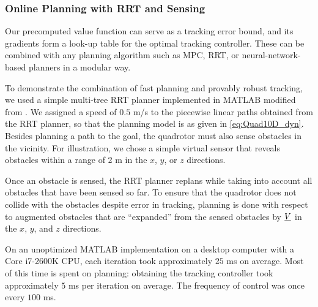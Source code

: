 \subsubsection{Online Planning with RRT and Sensing}
Our precomputed value function can serve as a tracking error bound, and its gradients form a look-up table for the optimal tracking controller. These can be combined with any planning algorithm such as MPC, RRT, or neural-network-based planners in a modular way. 

To demonstrate the combination of fast planning and provably robust tracking, we used a simple multi-tree RRT planner implemented in MATLAB modified from \cite{Gavin2013}. We assigned a speed of $0.5$ m/s to the piecewise linear paths obtained from the RRT planner, so that the planning model is as given in \eqref{eq:Quad10D_dyn}. Besides planning a path to the goal, the quadrotor must also sense obstacles in the vicinity. For illustration, we chose a simple virtual sensor that reveals obstacles within a range of 2 m in the $x$, $y$, or $z$ directions.

Once an obstacle is sensed, the RRT planner replans while taking into account all obstacles that have been sensed so far. To ensure that the quadrotor does not collide with the obstacles despite error in tracking, planning is done with respect to augmented obstacles that are ``expanded'' from the sensed obstacles by $\underline{V}$ in the $x$, $y$, and $z$ directions.

On an unoptimized MATLAB implementation on a desktop computer with a Core i7-2600K CPU, each iteration took approximately $25$ ms on average. Most of this time is spent on planning: obtaining the tracking controller took approximately $5$ ms per iteration on average. The frequency of control was once every $100$ ms.

